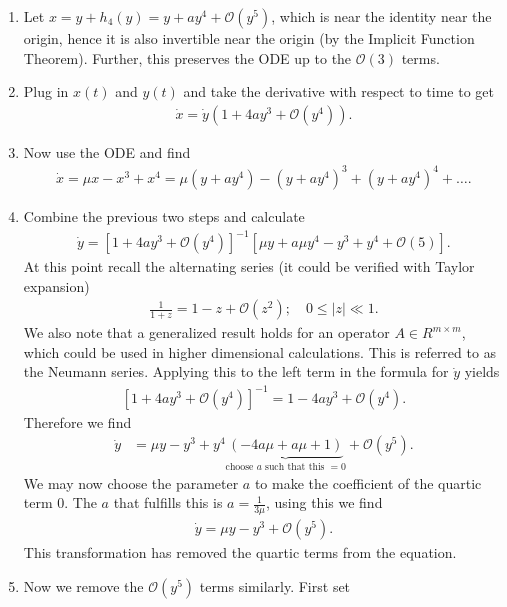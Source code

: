 \begin{ex}
	\begin{enumerate}
		\item 		
	Let $x =y + h_4(y)= y+ay^4 + \mathcal{O}(y^5) $, which is near the identity near the origin, hence it is also invertible near the origin (by the Implicit Function Theorem). Further, this preserves the ODE up to the $\mathcal{O}(3)$ terms.  
\item
	Plug in $x(t)$ and $y(t)$ and take the derivative with respect to time to get
	\begin{align}
		\dot{x} = \dot{y}(1+4ay^3 + \mathcal{O}(y^4)).
	\end{align}
\item 
Now use the ODE and find
\begin{align}
	\dot{x}=\mu x - x^3 +x^4 = \mu (y+ay^4)-(y+ay^4)^3 + (y+ay^4)^4 + \ldots.
\end{align}
\item
	Combine the previous two steps and calculate
\begin{align}
	\dot{y}= \left[1 + 4ay^3 + \mathcal{O}(y^4)\right]^{-1} \left[\mu y + a \mu y^4 - y^3+y^4 + \mathcal{O}(5)\right].	
\end{align}
At this point recall the alternating series (it could be verified with Taylor expansion)
\begin{align}
	\frac{1}{1+z} = 1-z + \mathcal{O}(z^2);\quad 0 \leq |z| \ll 1.
\end{align}
We also note that a generalized result holds for an operator $A \in R^{m \times m }$, which could be used in higher dimensional calculations. This is referred to as the Neumann series. Applying this to the left term in the formula for $\dot{y}$ yields
\begin{align}
	\left[1 + 4ay^3 + \mathcal{O}(y^4)\right]^{-1}=1 - 4ay^3 + \mathcal{O}(y^4). 
\end{align}
Therefore we find
\begin{align}
	\dot{y} &= \mu y - y^3 + y^4\underbrace{(-4a \mu  +a \mu +1)}_{ \textrm{choose }a  \textrm{ such that this }  =0} + \mathcal{O}(y^5).
\end{align}
We may now choose the parameter $a$ to make the coefficient of the quartic term 0. The $a$ that fulfills this is $a=\frac{1}{3 \mu }$, using this we find
\begin{align}
	\boxed{
		\dot{y} = \mu y-y^3+\mathcal{O}(y^5).
	}
\end{align}
This transformation has removed the quartic terms from the equation.
\item
	Now we remove the $\mathcal{O}(y^5)$ terms similarly. First set 

\end{enumerate}
\end{ex}
